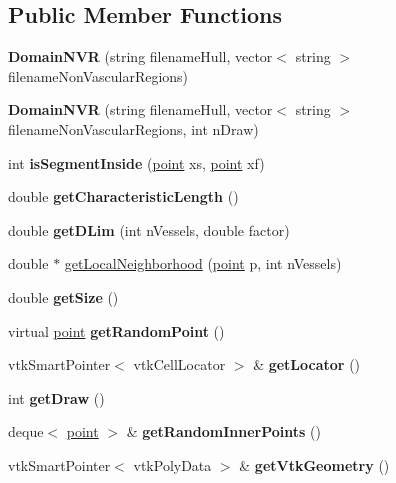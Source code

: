 \subsection*{Public Member Functions}
\begin{DoxyCompactItemize}
\item 
\mbox{\label{class_domain_n_v_r_a9e910d94be1cef67bea4f406bac47c7f}} 
{\bfseries Domain\+N\+VR} (string filename\+Hull, vector$<$ string $>$ filename\+Non\+Vascular\+Regions)
\item 
\mbox{\label{class_domain_n_v_r_a93c48145afda22460019c43b5808724b}} 
{\bfseries Domain\+N\+VR} (string filename\+Hull, vector$<$ string $>$ filename\+Non\+Vascular\+Regions, int n\+Draw)
\item 
\mbox{\label{class_domain_n_v_r_a46b7a56ffdb8f8e0cfcd2a5761571394}} 
int {\bfseries is\+Segment\+Inside} (\mbox{\hyperlink{structpoint}{point}} xs, \mbox{\hyperlink{structpoint}{point}} xf)
\item 
\mbox{\label{class_domain_n_v_r_a590ea752ce83767038de90138faf8a21}} 
double {\bfseries get\+Characteristic\+Length} ()
\item 
\mbox{\label{class_domain_n_v_r_a396d51aa262e4b40a7b0416e4e5b7238}} 
double {\bfseries get\+D\+Lim} (int n\+Vessels, double factor)
\item 
double $\ast$ \mbox{\hyperlink{class_domain_n_v_r_a400dcad443d14d5eee1938621689e4c7}{get\+Local\+Neighborhood}} (\mbox{\hyperlink{structpoint}{point}} p, int n\+Vessels)
\item 
\mbox{\label{class_domain_n_v_r_aae7b6782c1caab8cf5246c802be410cc}} 
double {\bfseries get\+Size} ()
\item 
\mbox{\label{class_domain_n_v_r_a88c76433bc3e8a1c1d60d4e7643f46d0}} 
virtual \mbox{\hyperlink{structpoint}{point}} {\bfseries get\+Random\+Point} ()
\item 
\mbox{\label{class_domain_n_v_r_ad88301601b9ff38a0c1526ef3a17a141}} 
vtk\+Smart\+Pointer$<$ vtk\+Cell\+Locator $>$ \& {\bfseries get\+Locator} ()
\item 
\mbox{\label{class_domain_n_v_r_a3fead46c8720529bc3faaae5b817ccb7}} 
int {\bfseries get\+Draw} ()
\item 
\mbox{\label{class_domain_n_v_r_a2b303bccf9a1db72e3bae866d7947f2d}} 
deque$<$ \mbox{\hyperlink{structpoint}{point}} $>$ \& {\bfseries get\+Random\+Inner\+Points} ()
\item 
\mbox{\label{class_domain_n_v_r_a50591c2d4b9e055821cc53416bf4263c}} 
vtk\+Smart\+Pointer$<$ vtk\+Poly\+Data $>$ \& {\bfseries get\+Vtk\+Geometry} ()
\end{DoxyCompactItemize}
